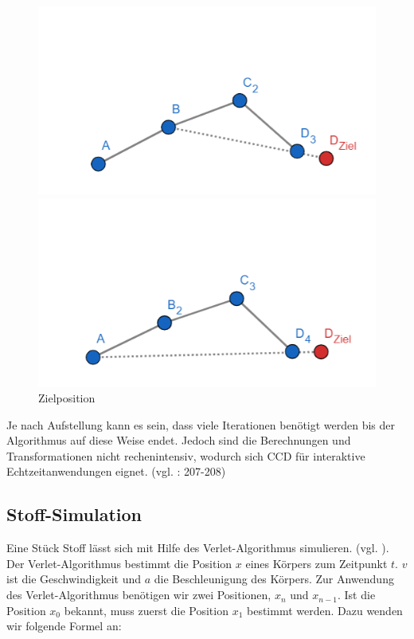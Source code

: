 \begin{figure}[!htb]
	\includegraphics[width=\linewidth]{img/ccd_2.png}
	\caption{}\label{fig:ccd_2}
	\endminipage\hfill
	\includegraphics[width=\linewidth]{img/ccd_3.png}
	\caption{Zielposition}\label{fig:ccd_3}
	\endminipage\hfill
\end{figure}
Je nach Aufstellung kann es sein, dass viele Iterationen benötigt werden bis der Algorithmus auf diese Weise endet. Jedoch sind die Berechnungen und Transformationen nicht rechenintensiv, wodurch sich CCD für interaktive Echtzeitanwendungen eignet. (vgl. \cite{Fedor2003}: 207-208)
\subsection{Stoff-Simulation}
Eine Stück Stoff lässt sich mit Hilfe des Verlet-Algorithmus simulieren. (vgl. \cite{Counts2012}). Der Verlet-Algorithmus bestimmt die Position $x$ eines Körpers zum Zeitpunkt $t$. $v$ ist die Geschwindigkeit und $a$ die Beschleunigung des Körpers. Zur Anwendung des Verlet-Algorithmus benötigen wir zwei Positionen, $x_n$ und $x_{n-1}$. Ist die Position $x_0$ bekannt, muss zuerst die Position $x_1$ bestimmt werden. Dazu wenden wir folgende Formel an:

